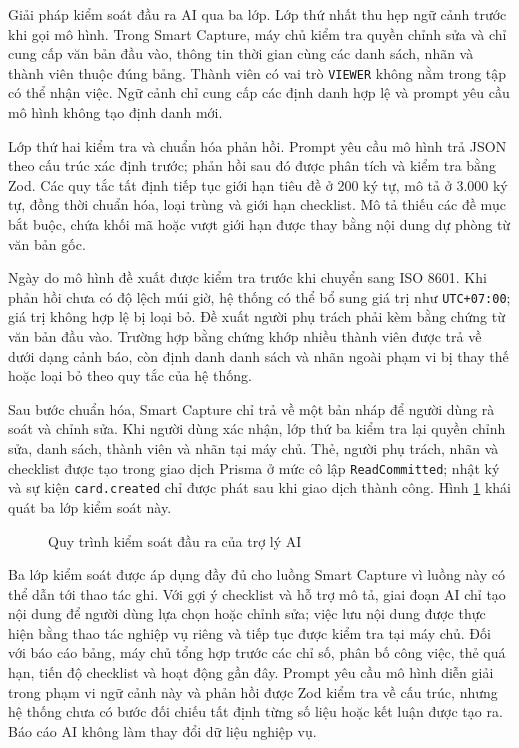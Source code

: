 \documentclass[../DoAn.tex]{subfiles}
\begin{document}
Giải pháp kiểm soát đầu ra AI qua ba lớp. Lớp thứ nhất thu hẹp ngữ cảnh trước khi gọi mô hình. Trong Smart Capture, máy chủ kiểm tra quyền chỉnh sửa và chỉ cung cấp văn bản đầu vào, thông tin thời gian cùng các danh sách, nhãn và thành viên thuộc đúng bảng. Thành viên có vai trò \texttt{VIEWER} không nằm trong tập có thể nhận việc. Ngữ cảnh chỉ cung cấp các định danh hợp lệ và prompt yêu cầu mô hình không tạo định danh mới.

Lớp thứ hai kiểm tra và chuẩn hóa phản hồi. Prompt yêu cầu mô hình trả JSON theo cấu trúc xác định trước; phản hồi sau đó được phân tích và kiểm tra bằng Zod. Các quy tắc tất định tiếp tục giới hạn tiêu đề ở 200 ký tự, mô tả ở 3.000 ký tự, đồng thời chuẩn hóa, loại trùng và giới hạn checklist. Mô tả thiếu các đề mục bắt buộc, chứa khối mã hoặc vượt giới hạn được thay bằng nội dung dự phòng từ văn bản gốc.

Ngày do mô hình đề xuất được kiểm tra trước khi chuyển sang ISO 8601. Khi phản hồi chưa có độ lệch múi giờ, hệ thống có thể bổ sung giá trị như \texttt{UTC+07:00}; giá trị không hợp lệ bị loại bỏ. Đề xuất người phụ trách phải kèm bằng chứng từ văn bản đầu vào. Trường hợp bằng chứng khớp nhiều thành viên được trả về dưới dạng cảnh báo, còn định danh danh sách và nhãn ngoài phạm vi bị thay thế hoặc loại bỏ theo quy tắc của hệ thống.

Sau bước chuẩn hóa, Smart Capture chỉ trả về một bản nháp để người dùng rà soát và chỉnh sửa. Khi người dùng xác nhận, lớp thứ ba kiểm tra lại quyền chỉnh sửa, danh sách, thành viên và nhãn tại máy chủ. Thẻ, người phụ trách, nhãn và checklist được tạo trong giao dịch Prisma ở mức cô lập \texttt{ReadCommitted}; nhật ký và sự kiện \texttt{card.created} chỉ được phát sau khi giao dịch thành công. Hình \ref{fig:chapter5_ai_guardrail_pipeline} khái quát ba lớp kiểm soát này.

\begin{figure}[H]
    \centering
    \caption{Quy trình kiểm soát đầu ra của trợ lý AI}
    \label{fig:chapter5_ai_guardrail_pipeline}
\end{figure}

Ba lớp kiểm soát được áp dụng đầy đủ cho luồng Smart Capture vì luồng này có thể dẫn tới thao tác ghi. Với gợi ý checklist và hỗ trợ mô tả, giai đoạn AI chỉ tạo nội dung để người dùng lựa chọn hoặc chỉnh sửa; việc lưu nội dung được thực hiện bằng thao tác nghiệp vụ riêng và tiếp tục được kiểm tra tại máy chủ. Đối với báo cáo bảng, máy chủ tổng hợp trước các chỉ số, phân bố công việc, thẻ quá hạn, tiến độ checklist và hoạt động gần đây. Prompt yêu cầu mô hình diễn giải trong phạm vi ngữ cảnh này và phản hồi được Zod kiểm tra về cấu trúc, nhưng hệ thống chưa có bước đối chiếu tất định từng số liệu hoặc kết luận được tạo ra. Báo cáo AI không làm thay đổi dữ liệu nghiệp vụ.
\end{document}
